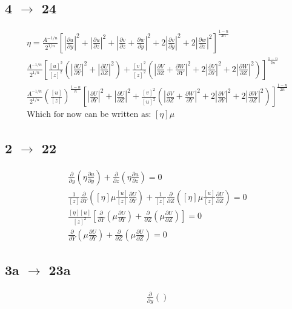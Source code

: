 \documentclass[10pt, letterpaper, twoside]{article}
\newcommand{\pd}[2]{\frac{\partial#1}{\partial#2}}
\begin{document}
	\subsection{4 $ \rightarrow $ 24}
	\begin{gather*}
		\eta = \frac{A^{-1/n}}{2^{1/n}}\left[\left|\pd{u}{y}\right|^2 + \left|\pd{u}{z}\right|^2 + \left|\pd{v}{z} + \pd{w}{y}\right|^2 + 2\left|\pd{v}{y}\right|^2 + 2\left|\pd{w}{z}\right|^2\right]^{\frac{1-n}{2n}}\\
		\frac{A^{-1/n}}{2^{1/n}}\left[\frac{\left[u\right]^2}{\left[z\right]^2}\left(\left|\pd{U}{Y}\right|^2 + \left|\pd{U}{Z}\right|^2\right) + \frac{\left[v\right]^2}{\left[z\right]^2}\left(\left|\pd{V}{Z} + \pd{W}{Y}\right|^2 + 2\left|\pd{V}{Y}\right|^2 + 2\left|\pd{W}{Z}\right|^2\right)\right]^{\frac{1-n}{2n}}\\
		\frac{A^{-1/n}}{2^{1/n}}\left(\frac{\left[u\right]}{\left[z\right]}\right)^{\frac{1-n}{n}}\left[\left|\pd{U}{Y}\right|^2 + \left|\pd{U}{Z}\right|^2 + \frac{\left[v\right]^2}{\left[u\right]^2}\left(\left|\pd{V}{Z} + \pd{W}{Y}\right|^2 + 2\left|\pd{V}{Y}\right|^2 + 2\left|\pd{W}{Z}\right|^2\right)\right]^{\frac{1-n}{2n}}\\
		\text{Which for now can be written as: }\left[\eta\right]\mu
	\end{gather*}
	\subsection{2 $ \rightarrow $ 22}
	\begin{gather*}
		\pd{}{y}\left(\eta\pd{u}{y}\right) + \pd{}{z}\left(\eta\pd{u}{z}\right) = 0\\
		\frac{1}{\left[z\right]}\pd{}{Y}\left(\left[\eta\right]\mu\frac{\left[u\right]}{\left[z\right]}\pd{U}{Y}\right) + \frac{1}{\left[z\right]}\pd{}{Z}\left(\left[\eta\right]\mu\frac{\left[u\right]}{\left[z\right]}\pd{U}{Z}\right) = 0\\
		\frac{\left[\eta\right]\left[u\right]}{\left[z\right]^2}\left[\pd{}{Y}\left(\mu\pd{U}{Y}\right) + \pd{}{Z}\left(\mu\pd{U}{Z}\right)\right] = 0\\
		\pd{}{Y}\left(\mu\pd{U}{Y}\right) + \pd{}{Z}\left(\mu\pd{U}{Z}\right) = 0
	\end{gather*}
	\subsection{3a $ \rightarrow $ 23a}
	\begin{gather*}
		\pd{}{y}\left(\right)
	\end{gather*}
	
\end{document}
